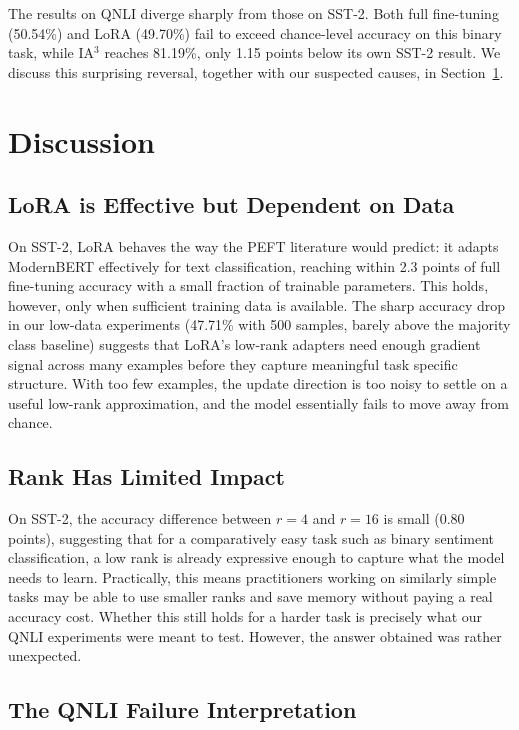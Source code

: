 \documentclass[11pt]{article}
\begin{document}
The results on QNLI diverge sharply from those on SST-2. Both full
fine-tuning (50.54\%) and LoRA (49.70\%) fail to exceed chance-level
accuracy on this binary task, while IA$^3$ reaches 81.19\%, only 1.15
points below its own SST-2 result. We discuss this surprising reversal,
together with our suspected causes, in Section~\ref{sec:discussion}.

\section{Discussion}
\label{sec:discussion}

\subsection{LoRA is Effective but Dependent on Data}

On SST-2, LoRA behaves the way the PEFT literature would predict: it
adapts ModernBERT effectively for text classification, reaching within
2.3 points of full fine-tuning accuracy with a small fraction of
trainable parameters. This holds, however, only when sufficient training
data is available. The sharp accuracy drop in our low-data experiments
(47.71\% with 500 samples, barely above the majority class baseline)
suggests that LoRA's low-rank adapters need enough gradient signal across
many examples before they capture meaningful task specific structure.
With too few examples, the update direction is too noisy to settle on a
useful low-rank approximation, and the model essentially fails to move
away from chance.

\subsection{Rank Has Limited Impact}

On SST-2, the accuracy difference between $r=4$ and $r=16$ is small
(0.80 points), suggesting that for a comparatively easy task such as
binary sentiment classification, a low rank is already expressive enough
to capture what the model needs to learn. Practically, this means
practitioners working on similarly simple tasks may be able to use
smaller ranks and save memory without paying a real accuracy cost.
Whether this still holds for a harder task is precisely what our QNLI
experiments were meant to test. However, the answer obtained was rather unexpected.

\subsection{The QNLI Failure Interpretation}
\end{document}
